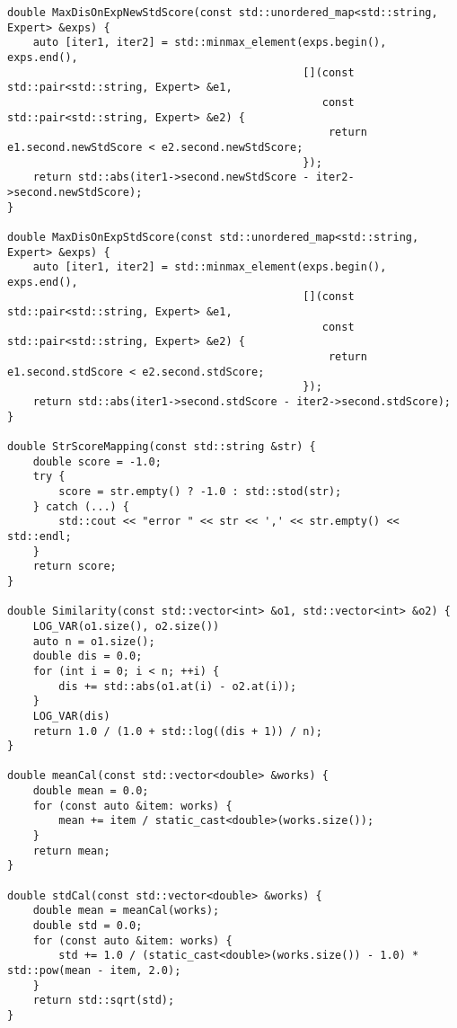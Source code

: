\documentclass[bwprint]{gmcmthesis}
\begin{document}
\begin{lstlisting}[label=util,caption={工具函数}]
double MaxDisOnExpNewStdScore(const std::unordered_map<std::string, Expert> &exps) {
    auto [iter1, iter2] = std::minmax_element(exps.begin(), exps.end(),
                                              [](const std::pair<std::string, Expert> &e1,
                                                 const std::pair<std::string, Expert> &e2) {
                                                  return e1.second.newStdScore < e2.second.newStdScore;
                                              });
    return std::abs(iter1->second.newStdScore - iter2->second.newStdScore);
}

double MaxDisOnExpStdScore(const std::unordered_map<std::string, Expert> &exps) {
    auto [iter1, iter2] = std::minmax_element(exps.begin(), exps.end(),
                                              [](const std::pair<std::string, Expert> &e1,
                                                 const std::pair<std::string, Expert> &e2) {
                                                  return e1.second.stdScore < e2.second.stdScore;
                                              });
    return std::abs(iter1->second.stdScore - iter2->second.stdScore);
}

double StrScoreMapping(const std::string &str) {
    double score = -1.0;
    try {
        score = str.empty() ? -1.0 : std::stod(str);
    } catch (...) {
        std::cout << "error " << str << ',' << str.empty() << std::endl;
    }
    return score;
}

double Similarity(const std::vector<int> &o1, std::vector<int> &o2) {
    LOG_VAR(o1.size(), o2.size())
    auto n = o1.size();
    double dis = 0.0;
    for (int i = 0; i < n; ++i) {
        dis += std::abs(o1.at(i) - o2.at(i));
    }
    LOG_VAR(dis)
    return 1.0 / (1.0 + std::log((dis + 1)) / n);
}

double meanCal(const std::vector<double> &works) {
    double mean = 0.0;
    for (const auto &item: works) {
        mean += item / static_cast<double>(works.size());
    }
    return mean;
}

double stdCal(const std::vector<double> &works) {
    double mean = meanCal(works);
    double std = 0.0;
    for (const auto &item: works) {
        std += 1.0 / (static_cast<double>(works.size()) - 1.0) * std::pow(mean - item, 2.0);
    }
    return std::sqrt(std);
}
\end{lstlisting}
\end{document}
